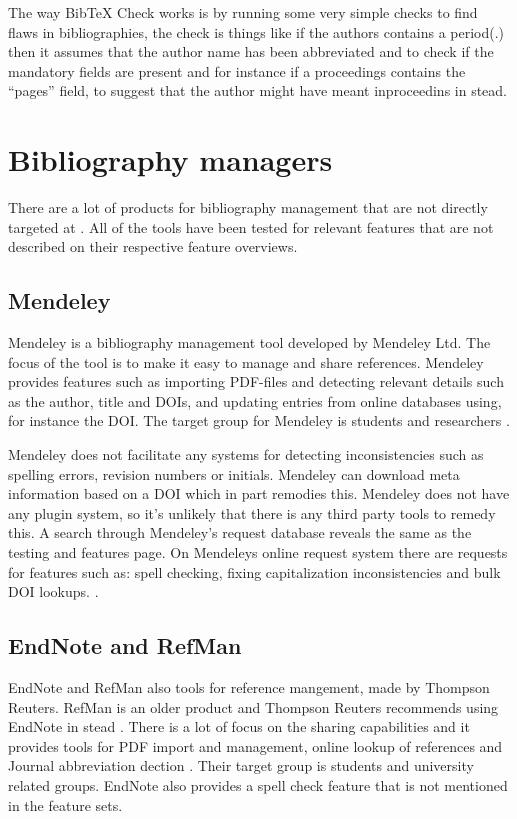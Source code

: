 The way Bib{\TeX} Check works is by running some very simple checks to
find flaws in bibliographies, the check is things like if the authors
contains a period(.) then it assumes that the author name has been
abbreviated and to check if the mandatory fields are present and for
instance if a proceedings contains the ``pages'' field, to suggest
that the author might have meant inproceedins in stead.

\section{Bibliography managers}
\label{sec:bib_managers}
There are a lot of products for bibliography management that are not
directly targeted at {\bibtex}.  All of the tools have been tested for
relevant features that are not described on their respective feature
overviews.

\subsection{Mendeley}
Mendeley is a bibliography management tool developed by Mendeley Ltd.
The focus of the tool is to make it easy to manage and share
references.  Mendeley provides features such as importing PDF-files
and detecting relevant details such as the author, title and DOIs, and
updating entries from online databases using, for instance the DOI.
The target group for Mendeley is students and researchers
\cite{mendeley_features}.

Mendeley does not facilitate any systems for detecting inconsistencies
such as spelling errors, revision numbers or initials.  Mendeley can
download meta information based on a DOI which in part remodies this.
Mendeley does not have any plugin system, so it's unlikely that there
is any third party tools to remedy this. A search through Mendeley's
request database reveals the same as the testing and features page.
On Mendeleys online request system there are requests for features
such as: spell checking, fixing capitalization inconsistencies and
bulk DOI lookups.  \cite{mendeley_request_spellcheck,
  mendeley_request_lowercase, mendeley_request_capitalization,
  mendeley_request_bulk_doi}.

\subsection{EndNote and RefMan}
EndNote and RefMan also tools for reference mangement, made by
Thompson Reuters.  RefMan is an older product and Thompson Reuters
recommends using EndNote in stead \cite{refman_switch,
  refman_features}.  There is a lot of focus on the sharing
capabilities and it provides tools for PDF import and management,
online lookup of references and Journal abbreviation dection
\cite{endnote_basic_features, endnote_x7_features}.  Their target
group is students and university related groups.  EndNote also
provides a spell check feature that is not mentioned in the feature
sets\cite{endnote_spellcheck}.

